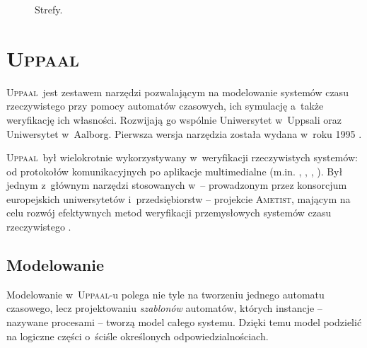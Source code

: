 \documentclass{pracamgr}
\newcommand{\upp}{\textsc{Uppaal}}
\theoremstyle{plain}
\begin{document}
\begin{figure}
  \centering
   \hspace{1cm}
  \caption{Strefy.}
  \label{img:zones}
\end{figure}

\section{\upp}
\label{uppaal}

\upp\ jest zestawem narzędzi pozwalającym na modelowanie systemów czasu
rzeczywistego przy pomocy automatów czasowych, ich symulację a~także
weryfikację ich własności. Rozwijają go wspólnie Uniwersytet w~Uppsali
oraz Uniwersytet w~Aalborg. Pierwsza wersja narzędzia została wydana w~roku
1995 \cite{lpw:fct95}.

\upp\ był wielokrotnie wykorzystywany w~weryfikacji rzeczywistych
systemów: od protokołów komunikacyjnych po aplikacje multimedialne
(m.in. \cite{lp:prfts97}, \cite{lpw:tacas98},
\cite{DBLP:conf/icfem/BordbarO03},
\cite{Ravn:2011:MVW:1987389.1987431}). Był jednym z~głównym narzędzi
stosowanych w~-- prowadzonym przez konsorcjum europejskich
uniwersytetów i~przedsiębiorstw -- projekcie \textsc{Ametist}, mającym
na celu rozwój efektywnych metod weryfikacji przemysłowych systemów czasu
rzeczywistego \cite{AMETISTfinal}.

\subsection{Modelowanie}
Modelowanie w~\upp-u polega nie tyle na tworzeniu jednego automatu
czasowego, lecz projektowaniu \emph{szablonów} automatów, których
instancje -- nazywane procesami -- tworzą model całego systemu. Dzięki
temu model podzielić na logiczne części o~ściśle określonych
odpowiedzialnościach.
\end{document}
